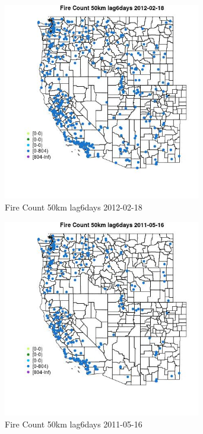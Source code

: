 \begin{figure} 
\centering  
\includegraphics[width=0.77\textwidth]{Code_Outputs/Report_ML_input_PM25_Step4_part_f_de_duplicated_aves_prioritize_24hr_obswNAs_MapObsFire_Count_50km_lag6days2012-02-18.jpg} 
\caption{\label{fig:Report_ML_input_PM25_Step4_part_f_de_duplicated_aves_prioritize_24hr_obswNAsMapObsFire_Count_50km_lag6days2012-02-18}Fire Count 50km lag6days 2012-02-18} 
\end{figure} 
 

\clearpage 

\begin{figure} 
\centering  
\includegraphics[width=0.77\textwidth]{Code_Outputs/Report_ML_input_PM25_Step4_part_f_de_duplicated_aves_prioritize_24hr_obswNAs_MapObsFire_Count_50km_lag6days2011-05-16.jpg} 
\caption{\label{fig:Report_ML_input_PM25_Step4_part_f_de_duplicated_aves_prioritize_24hr_obswNAsMapObsFire_Count_50km_lag6days2011-05-16}Fire Count 50km lag6days 2011-05-16} 
\end{figure} 
 

